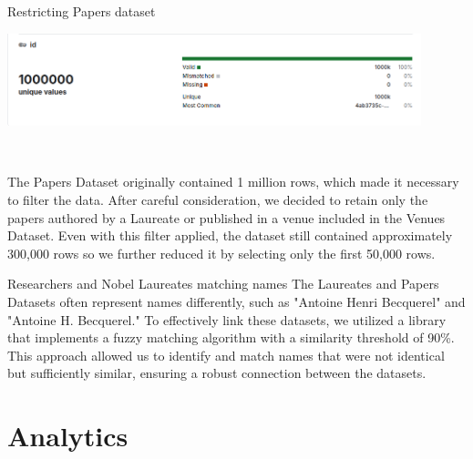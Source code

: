 \documentclass[aspectratio=169,xcolor=dvipsnames]{beamer}
\begin{document}
\begin{frame}{Restricting Papers dataset}
	\centering
	\begin{minipage}{0.8\textwidth}
		\centering
		\includegraphics[width=0.9\textwidth]{huge_dataset.png}
	\end{minipage} \\
	\vspace{1em}
	\begin{minipage}{0.8\textwidth}
		The Papers Dataset originally contained 1 million rows, which made it necessary to filter the data.
		After careful consideration, we decided to retain only the papers authored by a Laureate or published
		in a venue included in the Venues Dataset.
		Even with this filter applied, the dataset still contained approximately 300,000 rows so we further
		reduced it by selecting only the first 50,000 rows.
	\end{minipage}
\end{frame}

\begin{frame}{Researchers and Nobel Laureates matching names}
	The Laureates and Papers Datasets often represent names differently, such as "Antoine Henri Becquerel"
	and "Antoine H. Becquerel." To effectively link these datasets, we utilized a library that implements a
	fuzzy matching algorithm with a similarity threshold of 90\%. This approach allowed us to identify and
	match names that were not identical but sufficiently similar, ensuring a robust connection between the
	datasets.
\end{frame}

\section{Analytics}
\end{document}
